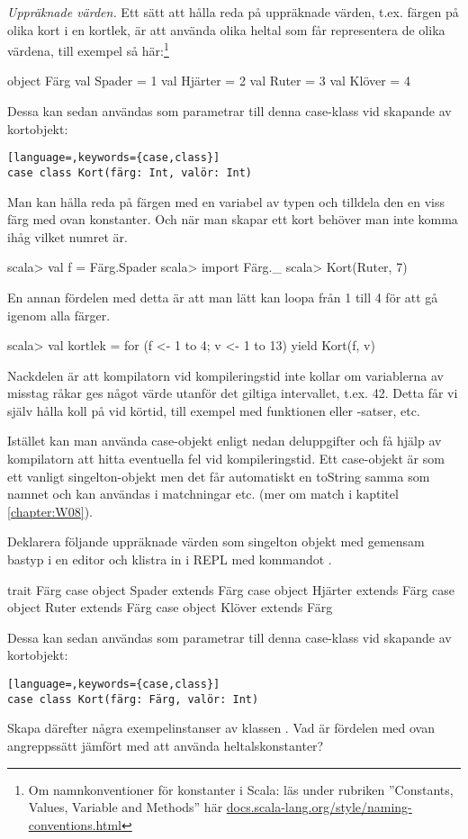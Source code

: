 \Task \emph{Uppräknade värden.} Ett sätt att hålla reda på uppräknade värden, t.ex. färgen på olika kort i en kortlek, är att använda olika heltal som får representera de olika värdena, till exempel så här:\footnote{Om namnkonventioner för konstanter i Scala: läs under rubriken ''Constants, Values, Variable and Methods'' här \href{http://docs.scala-lang.org/style/naming-conventions.html}{docs.scala-lang.org/style/naming-conventions.html}} 
\begin{Code}
object Färg {
  val Spader = 1
  val Hjärter = 2
  val Ruter = 3
  val Klöver = 4
}
\end{Code}
Dessa kan sedan användas som parametrar till denna case-klass vid skapande av kortobjekt:
\begin{lstlisting}[language=,keywords={case,class}]
case class Kort(färg: Int, valör: Int)
\end{lstlisting}
Man kan hålla reda på färgen med en variabel av typen  och tilldela den en viss färg med ovan konstanter. Och när man skapar ett kort behöver man inte komma ihåg vilket numret är.
\begin{REPL}
scala> val f = Färg.Spader
scala> import Färg._
scala> Kort(Ruter, 7)
\end{REPL}
En annan fördelen med detta är att man lätt kan loopa från 1 till 4 för att gå igenom alla färger. 
\begin{REPL}
scala> val kortlek = for (f <- 1 to 4; v <- 1 to 13) yield Kort(f, v)
\end{REPL}
Nackdelen är att kompilatorn vid kompileringstid inte kollar om variablerna av misstag råkar ges något värde utanför det giltiga intervallet, t.ex. 42. Detta får vi själv hålla koll på vid körtid, till exempel med funktionen  eller -satser, etc.

Istället kan man använda case-objekt enligt nedan deluppgifter och få hjälp av kompilatorn att hitta eventuella fel vid kompileringstid.  Ett case-objekt är som ett vanligt singelton-objekt men det får automatiskt en toString samma som namnet och kan användas i matchningar etc. (mer om match i kaptitel \ref{chapter:W08}). 

\Subtask Deklarera följande uppräknade värden som singelton objekt med gemensam bastyp i en editor och klistra in i REPL med kommandot . 
\begin{Code}
trait Färg
case object Spader extends Färg
case object Hjärter extends Färg
case object Ruter extends Färg
case object Klöver extends Färg
\end{Code}
Dessa kan sedan användas som parametrar till denna case-klass vid skapande av kortobjekt:
\begin{lstlisting}[language=,keywords={case,class}]
case class Kort(färg: Färg, valör: Int)
\end{lstlisting}
Skapa därefter några exempelinstanser av klassen . Vad är fördelen med ovan angreppssätt jämfört med att använda heltalskonstanter?


